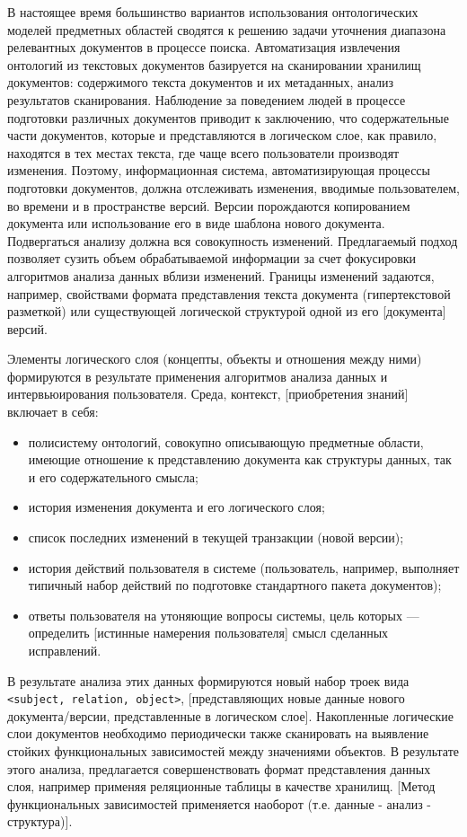 \documentclass[utf8]{../IncArticle}
\newcommand{\e}[2][fcolor]{\textcolor{pcolor}{[}\textcolor{#1}{#2}\textcolor{pcolor}{]}}
\begin{document}
В настоящее время большинство вариантов использования онтологических
моделей предметных областей сводятся к решению задачи уточнения
диапазона релевантных документов в процессе поиска.  Автоматизация
извлечения онтологий из текстовых документов базируется на
сканировании хранилищ документов: содержимого текста документов и их
метаданных, анализ результатов сканирования.  Наблюдение за поведением
людей в процессе подготовки различных документов приводит к
заключению, что содержательные части документов, которые и
представляются в логическом слое, как правило, находятся в тех местах
текста, где чаще всего пользователи производят изменения.  Поэтому,
информационная система, автоматизирующая процессы подготовки
документов, должна отслеживать изменения, вводимые пользователем, во
времени и в пространстве версий.  Версии порождаются копированием
документа или использование его в виде шаблона нового
документа.  Подвергаться анализу должна вся совокупность
изменений.  Предлагаемый подход позволяет сузить объем обрабатываемой
информации за счет фокусировки алгоритмов анализа данных вблизи
изменений.  Границы изменений задаются, например, свойствами формата
представления текста документа (гипертекстовой разметкой) или
существующей логической структурой одной из его \e{документа} версий.

Элементы логического слоя (концепты, объекты и отношения между ними)
формируются в результате применения алгоритмов анализа данных и
интервьюирования пользователя.  Среда, контекст, \e{приобретения знаний}
включает в себя:
\begin{itemize}
\item полисистему онтологий, совокупно описывающую предметные области,
  имеющие отношение к представлению документа как структуры данных,
  так и его содержательного смысла;
\item история изменения документа и его логического слоя;
\item список последних изменений в текущей транзакции (новой версии);
\item история действий пользователя в системе (пользователь, например,
  выполняет типичный набор действий по подготовке стандартного пакета документов);
\item ответы пользователя на утоняющие вопросы системы, цель которых
  --- определить \e{истинные намерения пользователя} смысл сделанных исправлений.
\end{itemize}

В результате анализа этих данных формируются новый набор троек вида
\texttt{<subject, relation, object>}, \e{представляющих новые данные
нового документа/версии, представленные в логическом
слое}.  Накопленные логические слои документов необходимо периодически
также сканировать на выявление стойких функциональных зависимостей
между значениями объектов.  В результате этого анализа, предлагается
совершенствовать формат представления данных слоя, например применяя
реляционные таблицы в качестве хранилищ.  \e{Метод функциональных
зависимостей применяется наоборот (т.е. данные - анализ - структура)}.
\end{document}
